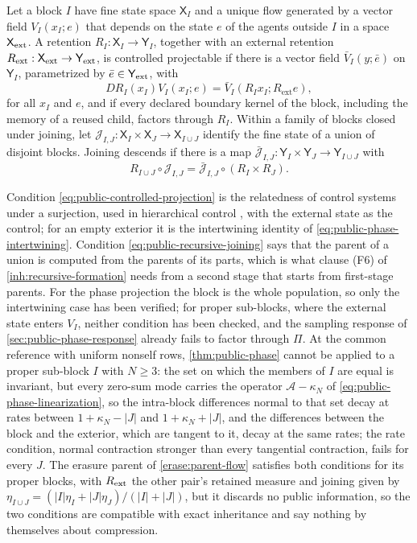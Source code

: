 Let a block $I$ have fine state space $\mathsf X_I$ and a unique flow generated by a vector field $V_I(x_I;e)$ that depends on the state $e$ of the agents outside $I$ in a space $\mathsf X_{\rm ext}$. A retention $R_I:\mathsf X_I\to\mathsf Y_I$, together with an external retention $R_{\rm ext}:\mathsf X_{\rm ext}\to\mathsf Y_{\rm ext}$, is controlled projectable if there is a vector field $\bar V_I(y;\bar e)$ on $\mathsf Y_I$, parametrized by $\bar e\in\mathsf Y_{\rm ext}$, with
\begin{equation}
 DR_I(x_I)V_I(x_I;e)
 =\bar V_I(R_Ix_I;R_{\mathrm{ext}}e),
 \label{eq:public-controlled-projection}
\end{equation}
for all $x_I$ and $e$, and if every declared boundary kernel of the block, including the memory of a reused child, factors through $R_I$. Within a family of blocks closed under joining, let $\mathcal J_{I,J}:\mathsf X_I\times\mathsf X_J\to\mathsf X_{I\cup J}$ identify the fine state of a union of disjoint blocks. Joining descends if there is a map $\bar{\mathcal J}_{I,J}:\mathsf Y_I\times\mathsf Y_J\to\mathsf Y_{I\cup J}$ with
\begin{equation}
 R_{I\cup J}\circ\mathcal J_{I,J}
 =\bar{\mathcal J}_{I,J}\circ(R_I\times R_J).
 \label{eq:public-recursive-joining}
\end{equation}

Condition \cref{eq:public-controlled-projection} is the relatedness of control systems under a surjection, used in hierarchical control \citep{PappasLafferriereSastry2000}, with the external state as the control; for an empty exterior it is the intertwining identity of \cref{eq:public-phase-intertwining}. Condition \cref{eq:public-recursive-joining} says that the parent of a union is computed from the parents of its parts, which is what clause (F6) of \cref{inh:recursive-formation} needs from a second stage that starts from first-stage parents. For the phase projection the block is the whole population, so only the intertwining case has been verified; for proper sub-blocks, where the external state enters $V_I$, neither condition has been checked, and the sampling response of \cref{sec:public-phase-response} already fails to factor through $\Pi$. At the common reference with uniform nonself rows, \cref{thm:public-phase} cannot be applied to a proper sub-block $I$ with $N\geq3$: the set on which the members of $I$ are equal is invariant, but every zero-sum mode carries the operator $\mathcal A-\kappa_N$ of \cref{eq:public-phase-linearization}, so the intra-block differences normal to that set decay at rates between $1+\kappa_N-|J|$ and $1+\kappa_N+|J|$, and the differences between the block and the exterior, which are tangent to it, decay at the same rates; the rate condition, normal contraction stronger than every tangential contraction, fails for every $J$. The erasure parent of \cref{erase:parent-flow} satisfies both conditions for its proper blocks, with $R_{\rm ext}$ the other pair's retained measure and joining given by $\eta_{I\cup J}=(|I|\eta_I+|J|\eta_J)/(|I|+|J|)$, but it discards no public information, so the two conditions are compatible with exact inheritance and say nothing by themselves about compression.

